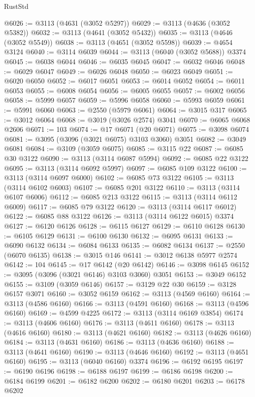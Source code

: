 \begin{lexlean}{RustStd}
\begin{coremodule}
@6026 := @3113 (@4631 (@3052 @5297))
@6029 := @3113 (@4636 (@3052 @5382))
@6032 := @3113 (@4641 (@3052 @5432))
@6035 := @3113 (@4646 (@3052 @5549))
@6038 := @3113 (@4651 (@3052 @5598))
@6039 := @4654 @3124
@6040 := @3114 @6039
@6044 := @3113 (@6040 (@3052 @5688)) @3374
@6045 := @6038 @6044
@6046 := @6035 @6045
@6047 := @6032 @6046
@6048 := @6029 @6047
@6049 := @6026 @6048
@6050 := @6023 @6049
@6051 := @6020 @6050
@6052 := @6017 @6051
@6053 := @6014 @6052
@6054 := @6011 @6053
@6055 := @6008 @6054
@6056 := @6005 @6055
@6057 := @6002 @6056
@6058 := @5999 @6057
@6059 := @5996 @6058
@6060 := @5993 @6059
@6061 := @5991 @6060
@6063 := @2550 (@5979 @6061)
@6064 := @3015 @317
@6065 := @3012 @6064
@6068 := @3019 (@3026 @2574) @3041
@6070 := @6065 @6068 @2606
@6071 := 103
@6074 := @17 @6071 (@20 @6071)
@6075 := @3098 @6074
@6081 := @3095 (@3096 (@3021 @6075) @3103 @3060) @3051
@6082 := @3049 @6081
@6084 := @3109 (@3059 @6075)
@6085 := @3115 @22
@6087 := @6085 @30 @3122
@6090 := @3113 (@3114 @6087 @5994)
@6092 := @6085 @22 @3122
@6095 := @3113 (@3114 @6092 @5997)
@6097 := @6085 @109 @3122
@6100 := @3113 (@3114 @6097 @6000)
@6102 := @6085 @73 @3122
@6105 := @3113 (@3114 @6102 @6003)
@6107 := @6085 @201 @3122
@6110 := @3113 (@3114 @6107 @6006)
@6112 := @6085 @213 @3122
@6115 := @3113 (@3114 @6112 @6009)
@6117 := @6085 @79 @3122
@6120 := @3113 (@3114 @6117 @6012)
@6122 := @6085 @88 @3122
@6126 := @3113 (@3114 @6122 @6015) @3374
@6127 := @6120 @6126
@6128 := @6115 @6127
@6129 := @6110 @6128
@6130 := @6105 @6129
@6131 := @6100 @6130
@6132 := @6095 @6131
@6133 := @6090 @6132
@6134 := @6084 @6133
@6135 := @6082 @6134
@6137 := @2550 (@6070 @6135)
@6138 := @3015 @146
@6141 := @3012 @6138 @5977 @2574
@6142 := 104
@6145 := @17 @6142 (@20 @6142)
@6146 := @3098 @6145
@6152 := @3095 (@3096 (@3021 @6146) @3103 @3060) @3051
@6153 := @3049 @6152
@6155 := @3109 (@3059 @6146)
@6157 := @3129 @22 @30
@6159 := @3128 @6157 @3071
@6160 := @3052 @6159
@6162 := @3113 (@4569 @6160)
@6164 := @3113 (@4586 @6160)
@6166 := @3113 (@4591 @6160)
@6168 := @3113 (@4596 @6160)
@6169 := @4599 @4225
@6172 := @3113 (@3114 @6169 @3854)
@6174 := @3113 (@4606 @6160)
@6176 := @3113 (@4611 @6160)
@6178 := @3113 (@4616 @6160)
@6180 := @3113 (@4621 @6160)
@6182 := @3113 (@4626 @6160)
@6184 := @3113 (@4631 @6160)
@6186 := @3113 (@4636 @6160)
@6188 := @3113 (@4641 @6160)
@6190 := @3113 (@4646 @6160)
@6192 := @3113 (@4651 @6160)
@6195 := @3113 (@6040 @6160) @3374
@6196 := @6192 @6195
@6197 := @6190 @6196
@6198 := @6188 @6197
@6199 := @6186 @6198
@6200 := @6184 @6199
@6201 := @6182 @6200
@6202 := @6180 @6201
@6203 := @6178 @6202

\end{coremodule}
\end{lexlean}
